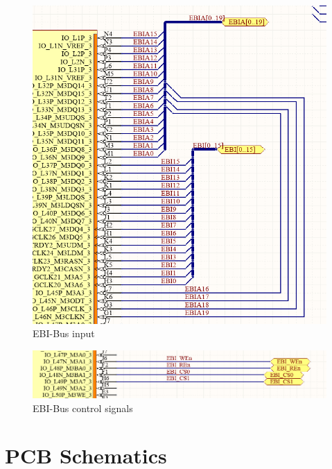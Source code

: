 \begin{figure}
    \includegraphics[width=\linewidth]{img/EBI-bus.png}
    \caption{EBI-Bus input}
    \label{fig:EbiBus}
\end{figure}

\begin{figure}
    \includegraphics[width=\linewidth]{img/EBI-bus_2.png}
    \caption{EBI-Bus control signals}
    \label{fig:EbiControl}
\end{figure}

\chapter{PCB Schematics}

